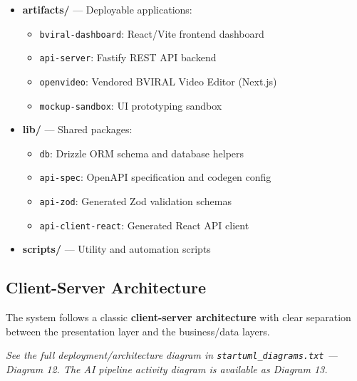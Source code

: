 \begin{itemize}
    \item \textbf{artifacts/} --- Deployable applications:
    \begin{itemize}
        \item \texttt{bviral-dashboard}: React/Vite frontend dashboard
        \item \texttt{api-server}: Fastify REST API backend
        \item \texttt{openvideo}: Vendored BVIRAL Video Editor (Next.js)
        \item \texttt{mockup-sandbox}: UI prototyping sandbox
    \end{itemize}
    \item \textbf{lib/} --- Shared packages:
    \begin{itemize}
        \item \texttt{db}: Drizzle ORM schema and database helpers
        \item \texttt{api-spec}: OpenAPI specification and codegen config
        \item \texttt{api-zod}: Generated Zod validation schemas
        \item \texttt{api-client-react}: Generated React API client
    \end{itemize}
    \item \textbf{scripts/} --- Utility and automation scripts
\end{itemize}

\subsection{Client-Server Architecture}

The system follows a classic \textbf{client-server architecture} with clear separation between the presentation layer and the business/data layers.


\noindent\textit{See the full deployment/architecture diagram in \texttt{startuml\_diagrams.txt} --- Diagram 12. The AI pipeline activity diagram is available as Diagram 13.}

